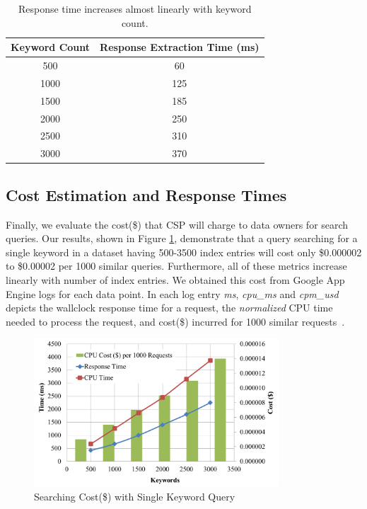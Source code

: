 \begin{table}[th!]
\centering
\begin{tabular}{| c | c | }
\hline
Keyword Count & Response Extraction Time (ms) \\
\hline
500  &  60 \\
1000 &  125 \\
1500 &  185 \\
2000 &  250 \\
2500 &  310 \\
3000 &  370 \\
\hline
\end{tabular}
\caption{Response time increases almost linearly with keyword count.}
\label{tab:search_response_time}

\end{table}


\subsection{Cost Estimation and Response Times}

Finally, we evaluate the cost(\$) that CSP will charge to data owners for search
queries. Our results, shown in Figure \ref{fig:cost_single_query}, demonstrate that a query
searching for a single keyword in a dataset having 500-3500 index entries will cost only \$0.000002 to \$0.00002 per 1000 similar
queries. Furthermore, all of these metrics increase linearly with number of index entries.
We obtained this cost from Google App Engine logs for each data point. In
each log entry \emph{ms}, \emph{cpu\_ms} and \emph{cpm\_usd} depicts the wallclock response
time for a request, the \emph{normalized} CPU time needed to process the
request, and cost(\$) incurred for 1000 similar requests~\cite{google_cloud_logs}.


\begin{figure}
  \centering
  \includegraphics[width= 3.6in]{figures/cost_keywords_graph.png}
  \caption{Searching Cost(\$) with Single Keyword Query}
  \label{fig:cost_single_query}
\end{figure}
